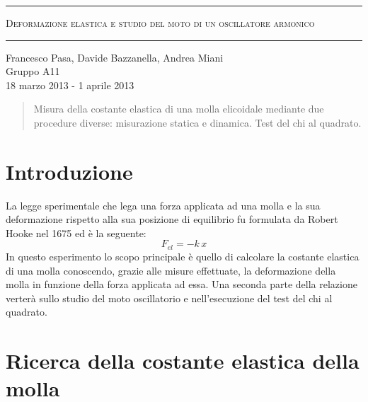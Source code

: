 \documentclass[11pt, twoside, a4paper]{article}
\begin{document}
\begin{titlepage}
\begin{center}
	\hrule \vspace{0.5cm}
     	\textsc{\LARGE Deformazione elastica e studio del moto di un oscillatore armonico}
	\vspace{0.5cm} \hrule \vspace{2cm}
      	{\large Francesco Pasa, Davide Bazzanella, Andrea Miani\\
		Gruppo A11}\\
	\vspace{0.5cm}
      	{\large 18 marzo 2013 - 1 aprile 2013}
	\vfill
	{\begin{abstract}
Misura della costante elastica di una molla elicoidale mediante due procedure diverse: misurazione statica e
dinamica. Test del chi al quadrato.
	 \end{abstract}}
\end{center}
\end{titlepage}

\newpage

\vspace*{\fill}
\begin{center}
	\tableofcontents
\end{center}
\vspace*{\fill}

\newpage

\section{Introduzione}
La legge sperimentale che lega una forza applicata ad una molla e la sua deformazione rispetto alla sua posizione di equilibrio fu formulata da Robert Hooke nel 1675 ed è la seguente:
\begin{equation}
	F_{el} = -k\,x
\end{equation}
In questo esperimento lo scopo principale è quello di calcolare la costante elastica di una molla conoscendo, grazie alle misure effettuate, la deformazione della molla in funzione della forza applicata ad essa. Una seconda parte della relazione verterà sullo studio del moto oscillatorio e nell'esecuzione del test del chi al quadrato.

\section{Ricerca della costante elastica della molla}
\end{document}
